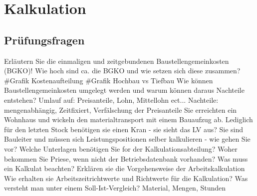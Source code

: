 \section{Kalkulation}

\subsection{Prüfungsfragen}
Erläutern Sie die einmaligen und zeitgebundenen Baustellengemeinkosten (BGKO)! Wie hoch sind ca. die BGKO und wie setzen sich diese zusammen? \newline \newline
#Grafik Kostenaufteilung \newline
#Grafik Hochbau vs Tiefbau \newline \newline
Wie können Baustellengemeinkosten umgelegt werden und warum können daraus Nachteile entstehen? \newline \newline
Umlauf auf: Preisanteile, Lohn, Mittellohn ect...\newline
Nachteile: mengenabhängig, Zeitfixiert, Verfälschung der Preisanteile \newline \newline
Sie erreichten ein Wohnhaus und wickeln den materialtransport mit einem Bauaufzug ab. Lediglich für den letzten Stock benötigen sie einen Kran - sie sieht das LV aus?\newline \newline
Sie sind Bauleiter und müssen sich Leistungspositionen selber kalkulieren - wie gehen Sie vor? Welche Unterlagen benötigen Sie for der Kalkulationsabteilung?\newline \newline
Woher bekommen Sie Priese, wenn nicht der Betriebsdatenbank vorhanden?\newline \newline
Was muss ein Kalkulat beachten?\newline\newline
Erklären sie die Vorgehensweise der Arbeitskalkulation\newline\newline
Wie erhalten sie Arbeitszeitrichtwerte und Richtwerte für die Kalkulation?\newline\newline
Was versteht man unter einem Soll-Ist-Vergleich?\newline\newline
Material, Mengen, Stunden\newline\newline
